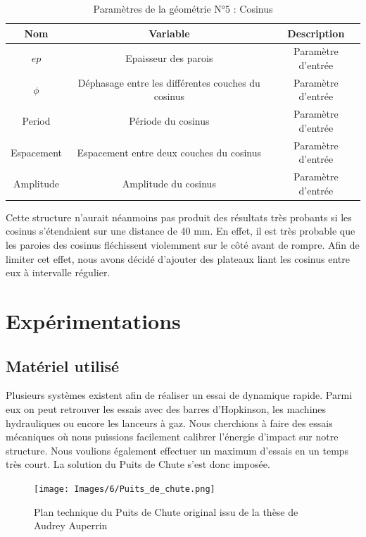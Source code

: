 \documentclass[a4paper]{article}
\begin{document}
	\begin{table}[H]
		\centering
		\begin{tabular}{|c|c|c|}
			\hline
			\rowcolor{Gray}
			\textbf{Nom} & \textbf{Variable} & \textbf{Description} \\
			\hline\hline 
			$ep$ & Epaisseur des parois & Paramètre d'entrée \\
			$\phi$ & Déphasage entre les différentes couches du cosinus & Paramètre d'entrée \\
			Period & Période du cosinus & Paramètre d'entrée \\
			Espacement & Espacement entre deux couches du cosinus & Paramètre d'entrée \\
			Amplitude & Amplitude du cosinus & Paramètre d'entrée \\
			\hline
		\end{tabular}
		\caption{Paramètres de la géométrie N°5 : Cosinus}
	\end{table}
	
	\hspace{0.5cm}Cette structure n’aurait néanmoins pas produit des résultats très probants si les cosinus s'étendaient sur une distance de 40 mm. En effet, il est très probable que les paroies des cosinus fléchissent violemment sur le côté avant de rompre. Afin de limiter cet effet, nous avons décidé d’ajouter des plateaux liant les cosinus entre eux à intervalle régulier.
	\newpage
	
	\section{Expérimentations}
	\subsection{Matériel utilisé}
	\hspace{0.5cm}Plusieurs systèmes existent afin de réaliser un essai de dynamique rapide. Parmi eux on peut retrouver les essais avec des barres d'Hopkinson, les machines hydrauliques ou encore les lanceurs à gaz. Nous cherchions à faire des essais mécaniques où nous puissions facilement calibrer l'énergie d'impact sur notre structure. Nous voulions également effectuer un maximum d'essais en un temps très court. La solution du Puits de Chute s'est donc imposée.
	
	\begin{figure}[H]
		\centering
		\texttt{[image: Images/6/Puits\_de\_chute.png]}\\
		\caption{Plan technique du Puits de Chute original issu de la thèse de Audrey Auperrin \cite{these_auperrin}}
	\end{figure}
	
\end{document}
